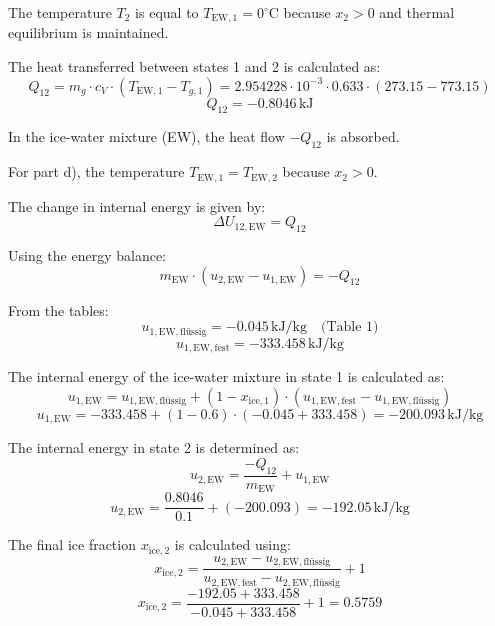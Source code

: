 The temperature \( T_2 \) is equal to \( T_{\text{EW},1} = 0^\circ \text{C} \) because \( x_2 > 0 \) and thermal equilibrium is maintained.

The heat transferred between states 1 and 2 is calculated as:  
\[
Q_{12} = m_g \cdot c_V \cdot (T_{\text{EW},1} - T_{g,1}) = 2.954228 \cdot 10^{-3} \cdot 0.633 \cdot (273.15 - 773.15)
\]  
\[
Q_{12} = -0.8046 \, \text{kJ}
\]

In the ice-water mixture (EW), the heat flow \( -Q_{12} \) is absorbed.

For part d), the temperature \( T_{\text{EW},1} = T_{\text{EW},2} \) because \( x_2 > 0 \).

The change in internal energy is given by:  
\[
\Delta U_{12,\text{EW}} = Q_{12}
\]

Using the energy balance:  
\[
m_{\text{EW}} \cdot (u_{2,\text{EW}} - u_{1,\text{EW}}) = -Q_{12}
\]

From the tables:  
\[
u_{1,\text{EW},\text{flüssig}} = -0.045 \, \text{kJ/kg} \quad \text{(Table 1)}
\]  
\[
u_{1,\text{EW},\text{fest}} = -333.458 \, \text{kJ/kg}
\]

The internal energy of the ice-water mixture in state 1 is calculated as:  
\[
u_{1,\text{EW}} = u_{1,\text{EW},\text{flüssig}} + (1 - x_{\text{ice},1}) \cdot (u_{1,\text{EW},\text{fest}} - u_{1,\text{EW},\text{flüssig}})
\]  
\[
u_{1,\text{EW}} = -333.458 + (1 - 0.6) \cdot (-0.045 + 333.458) = -200.093 \, \text{kJ/kg}
\]

The internal energy in state 2 is determined as:  
\[
u_{2,\text{EW}} = \frac{-Q_{12}}{m_{\text{EW}}} + u_{1,\text{EW}}
\]  
\[
u_{2,\text{EW}} = \frac{0.8046}{0.1} + (-200.093) = -192.05 \, \text{kJ/kg}
\]

The final ice fraction \( x_{\text{ice},2} \) is calculated using:  
\[
x_{\text{ice},2} = \frac{u_{2,\text{EW}} - u_{2,\text{EW},\text{flüssig}}}{u_{2,\text{EW},\text{fest}} - u_{2,\text{EW},\text{flüssig}}} + 1
\]  
\[
x_{\text{ice},2} = \frac{-192.05 + 333.458}{-0.045 + 333.458} + 1 = 0.5759
\]